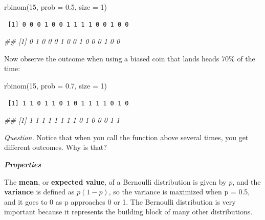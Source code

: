 \documentclass[
  letterpaper,
  DIV=11,
  numbers=noendperiod]{scrreprt}
\newenvironment{Shaded}{\begin{snugshade}}{\end{snugshade}}
\newcommand{\AttributeTok}[1]{\textcolor[rgb]{0.40,0.45,0.13}{#1}}
\newcommand{\DecValTok}[1]{\textcolor[rgb]{0.68,0.00,0.00}{#1}}
\newcommand{\DocumentationTok}[1]{\textcolor[rgb]{0.37,0.37,0.37}{\textit{#1}}}
\newcommand{\FloatTok}[1]{\textcolor[rgb]{0.68,0.00,0.00}{#1}}
\newcommand{\FunctionTok}[1]{\textcolor[rgb]{0.28,0.35,0.67}{#1}}
\newcommand{\NormalTok}[1]{\textcolor[rgb]{0.00,0.23,0.31}{#1}}
\begin{document}
\begin{Shaded}
\begin{Highlighting}[]
\FunctionTok{rbinom}\NormalTok{(}\DecValTok{15}\NormalTok{, }\AttributeTok{prob =} \FloatTok{0.5}\NormalTok{, }\AttributeTok{size =} \DecValTok{1}\NormalTok{)}
\end{Highlighting}
\end{Shaded}

\begin{verbatim}
 [1] 0 0 0 1 0 0 1 1 1 1 0 0 1 0 0
\end{verbatim}

\begin{Shaded}
\begin{Highlighting}[]
\DocumentationTok{\#\# [1] 0 1 0 0 0 1 0 0 1 0 0 0 1 0 0}
\end{Highlighting}
\end{Shaded}

Now observe the outcome when using a biased coin that lands heads 70\%
of the time:

\begin{Shaded}
\begin{Highlighting}[]
\FunctionTok{rbinom}\NormalTok{(}\DecValTok{15}\NormalTok{, }\AttributeTok{prob =} \FloatTok{0.7}\NormalTok{, }\AttributeTok{size =} \DecValTok{1}\NormalTok{)}
\end{Highlighting}
\end{Shaded}

\begin{verbatim}
 [1] 1 1 0 1 1 0 1 0 1 1 1 1 0 1 0
\end{verbatim}

\begin{Shaded}
\begin{Highlighting}[]
\DocumentationTok{\#\# [1] 1 1 1 1 1 1 1 1 0 1 0 0 0 1 1}
\end{Highlighting}
\end{Shaded}

\emph{Question.} Notice that when you call the function above several
times, you get different outcomes. Why is that?

\textbf{\emph{Properties}}

The \textbf{mean}, or \textbf{expected value}, of a Bernoulli
distribution is given by \(p\), and the \textbf{variance} is defined as
\(p(1-p)\), so the variance is maximized when p = 0.5, and it goes to 0
as p approaches 0 or 1. The Bernoulli distribution is very important
because it represents the building block of many other distributions.
\end{document}
